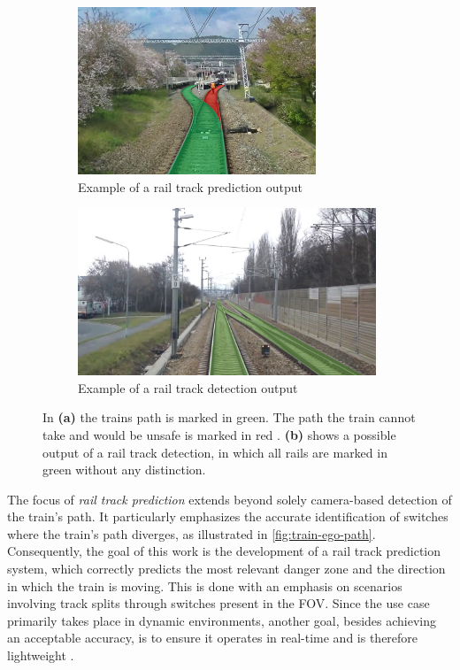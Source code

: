 \begin{figure}[H]
    \centering
    \begin{subfigure}{0.48\textwidth}
        \includegraphics[width=\linewidth, height=5cm, keepaspectratio]{PICs/Introduction/train-ego-path.png}
        \caption{Example of a rail track prediction output \cite{tepNet2024}}
        \label{fig:train-ego-path}
    \end{subfigure}
    \hfill
    \begin{subfigure}{0.48\textwidth}
        \includegraphics[width=\linewidth, height=5cm]{PICs/Introduction/railTrackDetection.jpg} %
        \caption{Example of a rail track detection output \cite{railsem19dataset}}
        \label{fig:railTrackDetection}
    \end{subfigure}
    \caption{In \textbf{(a)} the trains path is marked in green. The path the train cannot take and would be unsafe is marked in red \cite{tepNet2024}. \textbf{(b)} shows a possible output of a rail track detection, in which all rails are marked in green without any distinction.}
    \label{fig:comparisonRailTrackDetectionVSPrediction}
\end{figure}

\noindent The focus of \textit{rail track prediction} extends beyond solely camera-based detection of the train's path.
It particularly emphasizes the accurate identification of switches where the train's path diverges, as illustrated in \autoref{fig:train-ego-path}.
Consequently, the goal of this work is the development of a rail track prediction system, which correctly predicts the most relevant danger zone and the direction in which the train is moving.
This is done with an emphasis on scenarios involving track splits through switches present in the \ac{FOV}.
Since the use case primarily takes place in dynamic environments, another goal, besides achieving an acceptable accuracy, is to ensure it operates in real-time and is therefore lightweight \cite{tepNet2024}.

